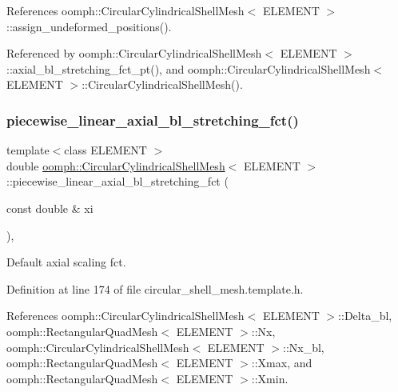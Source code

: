References oomph\+::\+Circular\+Cylindrical\+Shell\+Mesh$<$ E\+L\+E\+M\+E\+N\+T $>$\+::assign\+\_\+undeformed\+\_\+positions().



Referenced by oomph\+::\+Circular\+Cylindrical\+Shell\+Mesh$<$ E\+L\+E\+M\+E\+N\+T $>$\+::axial\+\_\+bl\+\_\+stretching\+\_\+fct\+\_\+pt(), and oomph\+::\+Circular\+Cylindrical\+Shell\+Mesh$<$ E\+L\+E\+M\+E\+N\+T $>$\+::\+Circular\+Cylindrical\+Shell\+Mesh().

\mbox{\label{classoomph_1_1CircularCylindricalShellMesh_a5730df8baedd890ca909f31e5452f3db}} 
\subsubsection{\texorpdfstring{piecewise\+\_\+linear\+\_\+axial\+\_\+bl\+\_\+stretching\+\_\+fct()}{piecewise\_linear\_axial\_bl\_stretching\_fct()}}
{\footnotesize\ttfamily template$<$class E\+L\+E\+M\+E\+NT $>$ \\
double \hyperlink{classoomph_1_1CircularCylindricalShellMesh}{oomph\+::\+Circular\+Cylindrical\+Shell\+Mesh}$<$ E\+L\+E\+M\+E\+NT $>$\+::piecewise\+\_\+linear\+\_\+axial\+\_\+bl\+\_\+stretching\+\_\+fct (\begin{DoxyParamCaption}\item[{const double \&}]{xi }\end{DoxyParamCaption})\hspace{0.3cm}{\ttfamily [inline]}, {\ttfamily [private]}}



Default axial scaling fct. 



Definition at line 174 of file circular\+\_\+shell\+\_\+mesh.\+template.\+h.



References oomph\+::\+Circular\+Cylindrical\+Shell\+Mesh$<$ E\+L\+E\+M\+E\+N\+T $>$\+::\+Delta\+\_\+bl, oomph\+::\+Rectangular\+Quad\+Mesh$<$ E\+L\+E\+M\+E\+N\+T $>$\+::\+Nx, oomph\+::\+Circular\+Cylindrical\+Shell\+Mesh$<$ E\+L\+E\+M\+E\+N\+T $>$\+::\+Nx\+\_\+bl, oomph\+::\+Rectangular\+Quad\+Mesh$<$ E\+L\+E\+M\+E\+N\+T $>$\+::\+Xmax, and oomph\+::\+Rectangular\+Quad\+Mesh$<$ E\+L\+E\+M\+E\+N\+T $>$\+::\+Xmin.



